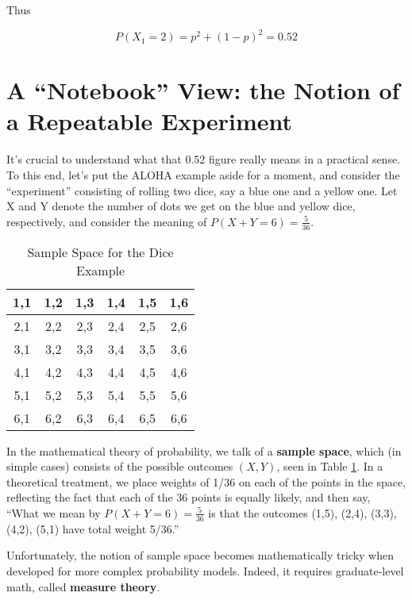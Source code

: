 Thus

\begin{equation}
\label{x12}
P(X_1 = 2) = p^2 + (1-p)^2 = 0.52
\end{equation}

\section{A ``Notebook'' View: the Notion of a Repeatable Experiment}
\label{repeatexpt}

It's crucial to understand what that 0.52 figure really means in a
practical sense.  To this end, let's put the ALOHA example aside for a
moment, and consider the ``experiment'' consisting of rolling two dice,
say a blue one and a yellow one.  Let X and Y denote the number of dots
we get on the blue and yellow dice, respectively, and consider the
meaning of $P(X+Y = 6) = \frac{5}{36}$.

\begin{table}
\begin{center}
\vskip 0.5in

\begin{tabular}{|c|c|c|c|c|c|}
\hline
1,1 & 1,2 & 1,3 & 1,4 & 1,5 & 1,6 \\
\hline
2,1 & 2,2 & 2,3 & 2,4 & 2,5 & 2,6 \\
\hline
3,1 & 3,2 & 3,3 & 3,4 & 3,5 & 3,6 \\
\hline
4,1 & 4,2 & 4,3 & 4,4 & 4,5 & 4,6 \\
\hline
5,1 & 5,2 & 5,3 & 5,4 & 5,5 & 5,6 \\
\hline
6,1 & 6,2 & 6,3 & 6,4 & 6,5 & 6,6 \\
\hline
\end{tabular}

\end{center}
\caption{Sample Space for the Dice Example}
\label{dicesamplespace}
\end{table}

In the mathematical theory of probability, we talk of a {\bf sample
space}, which (in simple cases) consists of the possible outcomes
$(X,Y)$, seen in Table \ref{dicesamplespace}.  In a theoretical
treatment, we place weights of 1/36 on each of the points in the space,
reflecting the fact that each of the 36 points is equally likely, and
then say, ``What we mean by $P(X+Y = 6) = \frac{5}{36}$ is that the
outcomes (1,5), (2,4), (3,3), (4,2), (5,1) have total weight 5/36.''

Unfortunately, the notion of sample space becomes mathematically tricky
when developed for more complex probability models.  Indeed, it requires
graduate-level math, called {\bf measure theory}.  

